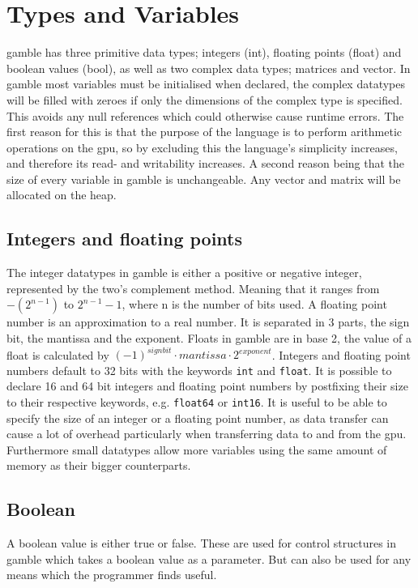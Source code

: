 \section{Types and Variables}\label{sec:Types}
\gls{gamble} has three primitive data types; integers (int), floating points (float) and boolean values (bool), as well as two complex data types; matrices and vector. 
In \gls{gamble} most variables must be initialised when declared, the complex datatypes will be filled with zeroes if only the dimensions of the complex type is specified.
This avoids any null references which could otherwise cause runtime errors. 
The first reason for this is that the purpose of the language is to perform arithmetic operations on the \acrshort{gpu}, so by excluding this the language's simplicity increases, and therefore its read- and writability increases.
A second reason being that the size of every variable in \gls{gamble} is unchangeable.
Any vector and matrix will be allocated on the heap. 

\subsection*{Integers and floating points}
The integer datatypes in \gls{gamble} is either a positive or negative integer, represented by the two's complement method. 
Meaning that it ranges from $-(2^{n-1}) $ to $2^{n-1} - 1 $, where n is the number of bits used.
A floating point number is an approximation to a real number. 
It is separated in 3 parts, the sign bit, the mantissa and the exponent. 
Floats in \gls{gamble} are in base 2, the value of a float is calculated by $ {(-1)}^{sign bit} \cdot mantissa \cdot 2^{exponent} $. 
Integers and floating point numbers default to 32 bits with the keywords \texttt{int} and \texttt{float}. 
It is possible to declare 16 and 64 bit integers and floating point numbers by postfixing their size to their respective keywords, e.g. \texttt{float64} or \texttt{int16}.
It is useful to be able to specify the size of an integer or a floating point number, as data transfer can cause a lot of overhead particularly when transferring data to and from the \acrshort{gpu}.
Furthermore small datatypes allow more variables using the same amount of memory as their bigger counterparts.

\subsection*{Boolean}
A boolean value is either true or false. 
These are used for control structures in \gls{gamble} which takes a boolean value as a parameter. 
But can also be used for any means which the programmer finds useful. 

